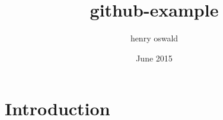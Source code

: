 \documentclass{article}
\title{github-example}
\author{henry oswald}
\date{June 2015}
\begin{document}
\maketitle

\section{Introduction}
\end{document}
